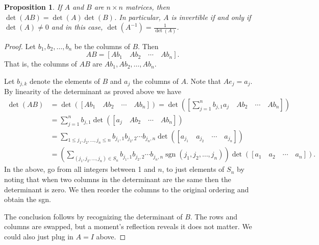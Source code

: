 \documentclass[12pt]{book}
\theoremstyle{plain}
\newtheorem{prop}[thm]{Proposition}
\theoremstyle{remark}
\theoremstyle{definition}
\theoremstyle{exercise}
\theoremstyle{example}
\begin{document}
\begin{prop}
If $A$ and $B$ are $n\times n$ matrices, then $\det(AB) = \det(A)\det(B)$.
In particular, $A$ is invertible if and only if $\det(A) \not= 0$ and in
this case, $\det(A^{-1}) = \frac{1}{\det(A)}$.
\end{prop}

\begin{proof}
Let $b_1,b_2,\ldots,b_n$ be the columns of $B$.  Then
\begin{equation*}
AB = [ Ab_1 \quad Ab_2 \quad  \cdots \quad  Ab_n ] .
\end{equation*}
That is, the columns of $AB$ are
$Ab_1,Ab_2,\ldots,Ab_n$.

Let $b_{j,k}$ denote the elements of $B$ and
$a_j$ the columns of $A$.  Note that $Ae_j = a_j$.
By linearity of the determinant as proved above we have
\begin{equation*}
\begin{split}
\det(AB) & =  
\det ([ Ab_1 \quad Ab_2 \quad  \cdots \quad  Ab_n ]) =
\det \left(\left[ \sum_{j=1}^n b_{j,1} a_j \quad Ab_2 \quad  \cdots \quad  Ab_n \right]\right) \\
& =
\sum_{j=1}^n
b_{j,1}
\det ([ a_j \quad Ab_2 \quad  \cdots \quad  Ab_n ]) \\
& =
\sum_{1 \leq j_1,j_2,\ldots,j_n \leq n}
b_{j_1,1}
b_{j_2,2}
\cdots
b_{j_n,n}
\det ([ a_{j_1} \quad a_{j_2} \quad  \cdots \quad  a_{j_n} ]) \\
& =
\left(
\sum_{(j_1,j_2,\ldots,j_n) \in S_n}
b_{j_1,1}
b_{j_2,2}
\cdots
b_{j_n,n}
\operatorname{sgn}(j_1,j_2,\ldots,j_n)
\right)
\det ([ a_{1} \quad a_{2} \quad  \cdots \quad  a_{n} ]) .
\end{split}
\end{equation*}
In the above, go from all integers between 1 and $n$,
to just elements of $S_n$ by noting that
when two columns in the determinant are the same then the
determinant is zero.  We then reorder the columns to the
original ordering and obtain the sgn.

The conclusion follows by recognizing the determinant of $B$.  
The rows and columns are swapped, but a moment's reflection reveals
it does not matter.  We could also just plug in $A=I$ above.


\end{proof}
\end{document}
